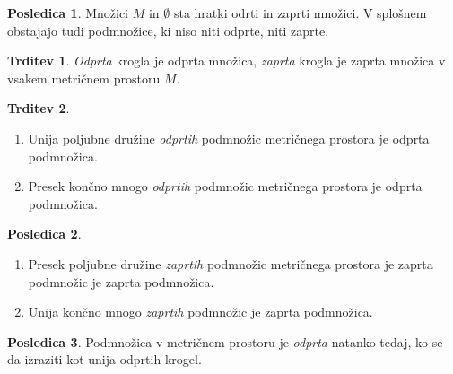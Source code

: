 \documentclass[11pt]{article}
\theoremstyle{definition}
\theoremstyle{definition}
\newtheorem{trditev}{Trditev}[section]
\theoremstyle{definition}
\newtheorem*{posledica}{Posledica}
\begin{document}
\begin{posledica}

Množici $M$ in $\emptyset$ sta hratki odrti in zaprti množici. V splošnem obstajajo tudi podmnožice, ki niso niti odprte, niti zaprte.

\end{posledica}
\vspace{0.5cm}

\begin{trditev}

\textit{Odprta} krogla je odprta množica, \textit{zaprta} krogla je zaprta množica v vsakem metričnem prostoru $M$.

\end{trditev}
\vspace{0.5cm}

\begin{trditev}
~
\begin{enumerate}
	\item Unija poljubne družine \textit{odprtih} podmnožic metričnega prostora je odprta podmnožica.
	\item Presek končno mnogo \textit{odprtih} podmnožic metričnega prostora je odprta podmnožica.
\end{enumerate}

\end{trditev}
\vspace{0.5cm}

\begin{posledica}
~
\begin{enumerate}
	\item Presek poljubne družine \textit{zaprtih} podmnožic metričnega prostora je zaprta podmnožic je zaprta podmnožica.
	\item Unija končno mnogo \textit{zaprtih} podmnožic je zaprta podmnožica.
\end{enumerate}

\end{posledica}
\vspace{0.5cm}

\begin{posledica}

Podmnožica v metričnem prostoru je \textit{odprta} natanko tedaj, ko se da izraziti kot unija odprtih krogel.

\end{posledica}
\vspace{0.5cm}

\end{document}
